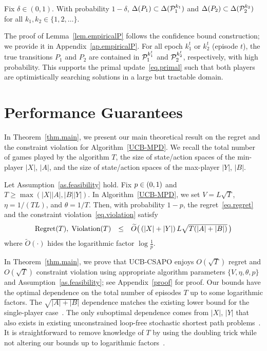 \documentclass[12pt, final]{l4dc2023}
\begin{document}
\begin{lemma}\label{lem.empiricalP}
	Fix $\delta\in (0,1)$. With probability $1-\delta$, $\Delta(P_1)\subset \Delta(\calP_1^{k_1})$ and $\Delta(P_2)\subset \Delta(\calP_2^{k_2})$ for all $k_1,k_2\in\{ 1,2,\ldots \}$.
\end{lemma}
The proof of Lemma~\ref{lem.empiricalP} follows the confidence bound construction; we provide it in Appendix~\ref{ap.empiricalP}. For all epoch $k_1^t$ or $k_2^t$ (episode $t$), the true transitions $P_1$ and $P_2$ are contained in $\calP_1^{k_1^t}$ and $\calP_2^{k_2^t}$, respectively, with high probability. This supports the primal update~\eqref{eq.primal} such that both players are optimistically searching solutions in a large but tractable domain.  

\vspace*{-1ex}
\section{Performance Guarantees}
\label{regret}


In Theorem~\ref{thm.main}, we present our main theoretical result on the regret and the constraint violation for Algorithm~\ref{UCB-MPD}. We recall the total number of games played by the algorithm $T$, the size of state/action spaces of the min-player $|X|$, $|A|$, and the size of state/action spaces of the max-player $|Y|$, $|B|$.

\begin{theorem}\label{thm.main}
	Let Assumption~\ref{as.feasibility} hold. 
	Fix $p\in\rbr{0,1}$ and $T\geq \max(|X||A|,|B||Y|)$. 
	In Algorithm~\ref{UCB-MPD}, we set
	$V=L\sqrt{T}$, $\eta = 1/(TL)$, and $\theta = 1/T$.
	Then, with probability $1-p$, the regret~\eqref{eq.regret} and the constraint violation~\eqref{eq.violation} satisfy 
	\[
	\begin{array}{rcl}
	\text{\normalfont Regret}(T),\; \text{\normalfont Violation}(T) & \leq & 
	\tilde O \big(\, (|X|+|Y|) \,L \sqrt{T(|A|+|B|)} \,\big)
	\end{array}
	\]
	where $\tilde O(\cdot)$ hides the logarithmic factor $\log\tfrac{1}{p}$.
\end{theorem}

In Theorem~\ref{thm.main}, we prove that UCB-CSAPO enjoys $O(\sqrt{T})$ regret and $O(\sqrt{T})$ constraint violation using appropriate algorithm parameters $\{V,\eta,\theta,p\}$ and Assumption~\ref{as.feasibility}; see Appendix~\ref{proof} for proof. Our bounds have the optimal dependence on the total number of episodes $T$ up to some logarithmic factors. The $\sqrt{ |A| +  |B|} $ dependence matches the existing lower bound for the single-player case~\citep{bai2020provable}. The only suboptimal dependence comes from $|X|$, $|Y|$ that also exists in existing unconstrained loop-free stochastic shortest path problems~\citep{rosenberg2019online}. It is straightforward to remove knowledge of $T$ by using the doubling trick while not altering our bounds up to logarithmic factors~\citep{rakhlin2013online}. 
\end{document}
